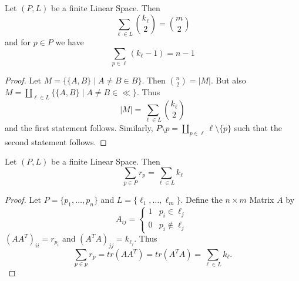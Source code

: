 \begin{Satz}
Let \((P,L)\) be a finite Linear Space.
Then 
\[\sum_{\ell\in L}\binom{k_\ell}{2}=\binom{m}{2}\]
and for \(p\in P\) we have
\[\sum_{p\in \ell}(k_\ell-1)=n-1\]
\end{Satz}
\begin{proof}
    Let \(M=\{\{A,B\}\mid A\neq B\in B\}\). 
    Then \(\binom{n}{2}=|M|\). 
    But also 
    \(M=\coprod_{\ell\in L}\{\{A,B\}\mid A\neq B\in \ll\}\).
    Thus 
    \[|M|=\sum_{\ell\in L}\binom{k_\ell}{2}\] and the first statement follows.
    Similarly,
    \(P\setminus{p}=\coprod_{p\in \ell}\ell\setminus\{p\}\) such that 
    the second statement follows.
\end{proof}






\begin{Satz}
Let \((P,L)\) be a finite Linear Space. Then 
\[\sum_{p\in P}r_p=\sum_{\ell\in L}k_\ell\]
\end{Satz}
\begin{proof}
Let \(P=\{p_1,\dots,p_n\}\) and \(L=\{\ell_1,\dots,\ell_m\}\).
Define the \(n\times m\) Matrix \(A\) by 
\[A_{ij}=\begin{cases} 1 & p_i\in \ell_j\\
    0 & p_i\not\in \ell_j
\end{cases}\] 
\((AA^T)_{ii}=r_{p_i}\) and
\((A^TA)_{jj}=k_{\ell_j}\). 
Thus
\[\sum_{p\in p}r_p=tr(AA^T)=tr(A^TA)=\sum_{\ell\in L}k_\ell.\]
\end{proof}


